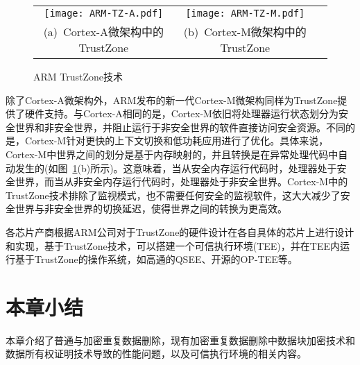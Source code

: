 \begin{figure}[!htb]
    \small
    \centering
    \begin{tabular}{@{}c@{}c@{}c}
        \texttt{[image: ARM-TZ-A.pdf]} &
        \hspace{5pt}
        \texttt{[image: ARM-TZ-M.pdf]}\\
        \mbox{\small (a) Cortex-A微架构中的TrustZone} &
        \mbox{\small (b) Cortex-M微架构中的TrustZone}\\
    \end{tabular}
    \caption{ARM TrustZone技术} 
    \label{fig:ARM-TZ-base}
\end{figure}

除了Cortex-A微架构外，ARM发布的新一代Cortex-M微架构\cite{cortex-m}同样为TrustZone提供了硬件支持。与Cortex-A相同的是，Cortex-M依旧将处理器运行状态划分为安全世界和非安全世界，并阻止运行于非安全世界的软件直接访问安全资源。不同的是，Cortex-M针对更快的上下文切换和低功耗应用进行了优化。具体来说，Cortex-M中世界之间的划分是基于内存映射的，并且转换是在异常处理代码中自动发生的(如图~\ref{fig:ARM-TZ-base}(b)所示)。这意味着，当从安全内存运行代码时，处理器处于安全世界，而当从非安全内存运行代码时，处理器处于非安全世界。Cortex-M中的TrustZone技术排除了监视模式，也不需要任何安全的监视软件，这大大减少了安全世界与非安全世界的切换延迟，使得世界之间的转换为更高效。

各芯片产商根据ARM公司对于TrustZone的硬件设计在各自具体的芯片上进行设计和实现，基于TrustZone技术，可以搭建一个可信执行环境(TEE)，并在TEE内运行基于TrustZone的操作系统，如高通的QSEE、开源的OP-TEE等。

\section{本章小结}

本章介绍了普通与加密重复数据删除，现有加密重复数据删除中数据块加密技术和数据所有权证明技术导致的性能问题，以及可信执行环境的相关内容。
